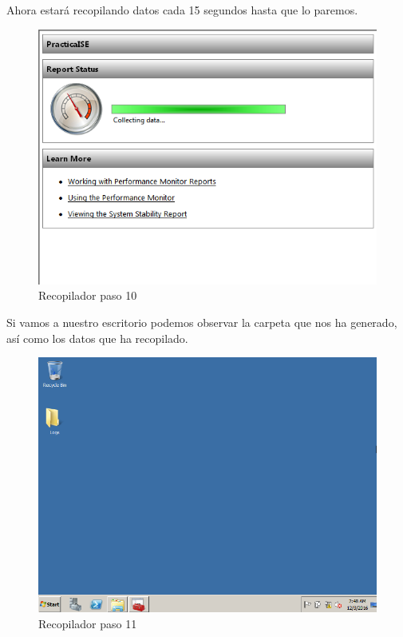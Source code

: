 Ahora estará recopilando datos cada 15 segundos hasta que lo paremos.
\begin{figure}[H] %
	\centering
	\includegraphics[scale=0.5]{pics/recopilador10.png}  %
	\caption{Recopilador paso 10} \label{fig:reco10}
\end{figure}

Si vamos a nuestro escritorio podemos observar la carpeta que nos ha generado, así como los datos que ha recopilado.

\begin{figure}[H] %
	\centering
	\includegraphics[scale=0.5]{pics/recopilador11.png}  %
	\caption{Recopilador paso 11} \label{fig:reco11}
\end{figure}

